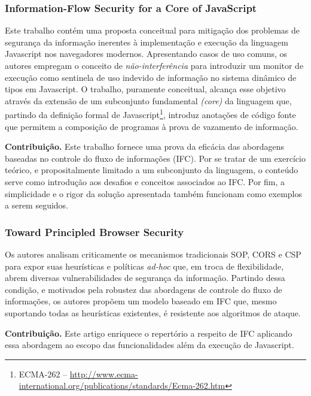 \subsubsection{Information-Flow Security for a Core of JavaScript \cite{Hedin2012}}
Este trabalho contém uma proposta conceitual para mitigação dos problemas de segurança da informação inerentes à implementação e execução da linguagem Javascript nos navegadores modernos. Apresentando casos de uso comuns, os autores empregam o conceito de \textit{não-interferência} para introduzir um monitor de execução como sentinela de uso indevido de informação no sistema dinâmico de tipos em Javascript. O trabalho, puramente conceitual, alcança esse objetivo através da extensão de um subconjunto fundamental \textit{(core)} da linguagem que, partindo da definição formal de Javascript\footnote{ECMA-262 -- \url{http://www.ecma-international.org/publications/standards/Ecma-262.htm}}, introduz anotações de código fonte que permitem a composição de programas à prova de vazamento de informação.

\textbf{Contribuição.} Este trabalho fornece uma prova da eficácia das abordagens baseadas no controle do fluxo de informações (IFC). Por se tratar de um exercício teórico, e propositalmente limitado a um subconjunto da linguagem, o conteúdo serve como introdução aos desafios e conceitos associados ao IFC. Por fim, a simplicidade e o rigor da solução apresentada também funcionam como exemplos a serem seguidos.


\subsubsection{Toward Principled Browser Security \cite{Yang2013}}
Os autores analisam criticamente os mecanismos tradicionais SOP, CORS e CSP para expor suas heurísticas e políticas \textit{ad-hoc} que, em troca de flexibilidade, abrem diversas vulnerabilidades de segurança da informação. Partindo dessa condição, e motivados pela robustez das abordagens de controle do fluxo de informações, os autores propõem um modelo baseado em IFC que, mesmo suportando todas as heurísticas existentes, é resistente aos algoritmos de ataque.

\textbf{Contribuição.} Este artigo enriquece o repertório a respeito de IFC aplicando essa abordagem ao escopo das funcionalidades além da execução de Javascript.


